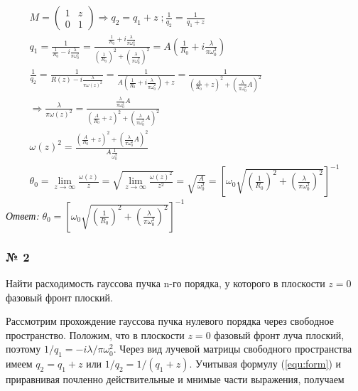 \documentclass[a4paper,12pt]{article}
\begin{document}
\begin{gather}
M = \begin{pmatrix}
       1 & z\\
        0 & 1
    \end{pmatrix} 
    \Rightarrow q_2 = q_1 + z\; ; \frac{1}{q_2} = \frac{1}{q_1 + z}\\
    q_1 = \frac{1}{\frac{1}{R_0} - i \frac{\lambda }{\pi \omega_0 ^2 }} = \frac{\frac{1}{R_0} + i \frac{\lambda }{\pi \omega_0 ^2}}{\left(\frac{1}{R_0}\right)^2 + \left(\frac{\lambda }{\pi \omega_0 ^2 }\right)^2} = A \left({\frac{1}{R_0} + i \frac{\lambda }{\pi \omega_0 ^2}}\right)\\
    \frac{1}{q_2} = \frac{1}{R\left(z\right) - i \frac{\lambda}{\pi \omega\left(z\right)^ 2}} = \frac{1}{A\left({\frac{1}{R_0} + i \frac{\lambda }{\pi \omega_0 ^2}}\right) + z}     = \frac{1}{\left(\frac{A}{R_0} + z\right)^ 2 + \left(\frac{\lambda}{\pi \omega_0 ^ 2} A\right) ^ 2}\\
    \Rightarrow \frac{ \lambda}{\pi \omega \left(z\right) ^ 2 } = \frac{\frac{\lambda }{\pi \omega_0 ^ 2} A}{ \left(\frac{A}{R_0} + z\right)^ 2 + \left(\frac{\lambda}{\pi \omega_0^ 2} A\right)^2}\\
    \omega\left(z\right)^2 = \frac{\left(\frac{A}{R_0} + z\right)^ 2 + \left(\frac{\lambda}{\pi \omega_0^ 2} A\right)^2}{ A \frac{1 }{\omega_0 ^ 2}}\\
    \theta_0 = \lim_{z \to \infty}\frac{\omega\left(z\right)}{z}
    = \sqrt{\lim_{z\to\infty}\frac{\omega\left(z\right) ^ 2}{z^2}} = \sqrt{\frac{A}{\omega_0^2}}  = \left[\omega_0 \sqrt{\left(\frac{1}{R_0}\right)^ 2  + \left(\frac{\lambda}{\pi \omega_0 ^ 2 }\right)^ 2}\right]^{-1}
\end{gather}
\textit{Ответ: }$\theta_0 = \left[\omega_0 \sqrt{\left(\frac{1}{R_0}\right)^ 2  + \left(\frac{\lambda}{\pi \omega_0 ^ 2 }\right)^ 2}\right]^{-1}$

\subsubsection*{№ 2}
Найти расходимость гауссова пучка n-го порядка, у которого в плоскости $z = 0$ фазовый фронт плоский.

Рассмотрим прохождение гауссова пучка нулевого порядка через свободное пространство. Положим, что в плоскости $z = 0$ фазовый фронт луча плоский, поэтому $1/q_1 = -i\lambda/{\pi\omega_0^2}$. Через вид лучевой матрицы свободного пространства имеем $q_2 = q_1 + z$ или $1/q_2 = 1/(q_1 + z)$. Учитывая формулу (\ref{equ:form}) и приравнивая почленно действительные и мнимые части выражения, получаем
\end{document}
